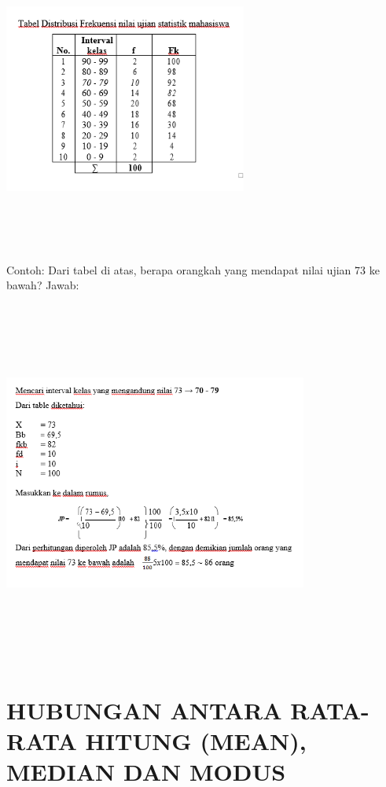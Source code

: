 \documentclass[11pt,fleqn]{book} %
\begin{document}
{\includegraphics[width = 8cm, height= 10cm]{Pictures/rizkie12.png}

Contoh:
Dari tabel di atas, berapa orangkah yang mendapat nilai ujian 73 ke bawah?
Jawab:

\includegraphics[width = 10cm, height= 12cm]{Pictures/rizkie13.png}

\section{HUBUNGAN ANTARA RATA-RATA HITUNG (MEAN), MEDIAN DAN MODUS}

}
\end{document}
